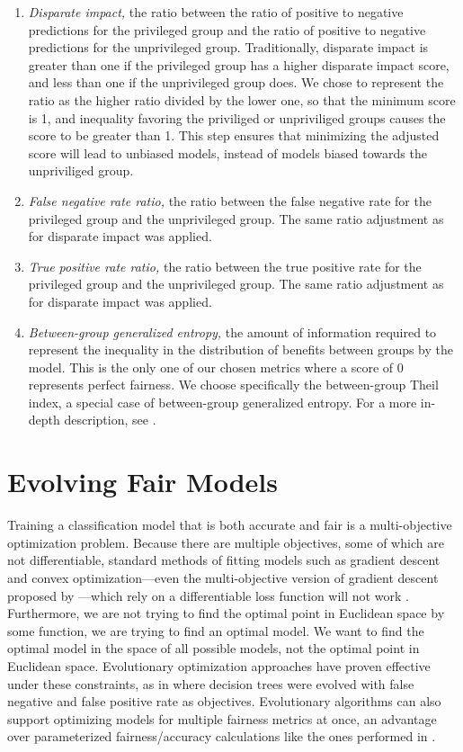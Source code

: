\documentclass[10pt]{acmart}
\begin{document}
\begin{enumerate}
	\item \textit{Disparate impact,} the ratio between the ratio of positive to negative predictions for the privileged group and the ratio of positive to negative predictions for the unprivileged group. Traditionally, disparate impact is greater than one if the privileged group has a higher disparate impact score, and less than one if the unprivileged group does. We chose to represent the ratio as the higher ratio divided by the lower one, so that the minimum score is 1, and inequality favoring the priviliged or unpriviliged groups causes the score to be greater than 1. This step ensures that minimizing the adjusted score will lead to unbiased models, instead of models biased towards the unpriviliged group.
	\item \textit{False negative rate ratio,} the ratio between the false negative rate for the privileged group and the unprivileged group. The same ratio adjustment as for disparate impact was applied.
	\item \textit{True positive rate ratio,} the ratio between the true positive rate for the privileged group and the unprivileged group. The same ratio adjustment as for disparate impact was applied.
	\item \textit{Between-group generalized entropy,} the amount of information required to represent the inequality in the distribution of benefits between groups by the model. This is the only one of our chosen metrics where a score of 0 represents perfect fairness. We choose specifically the between-group Theil index, a special case of between-group generalized entropy. For a more in-depth description, see \cite{Speicher:2018}.
\end{enumerate}

\section{Evolving Fair Models}
Training a classification model that is both accurate and fair is a multi-objective optimization problem. Because there are multiple objectives, some of which are not differentiable, standard methods of fitting models such as gradient descent and convex optimization---even the multi-objective version of gradient descent proposed by \citep{Desideri:2012}---which rely on a differentiable loss function will not work \citep{Zerbinati:2011}. Furthermore, we are not trying to find the optimal point in Euclidean space by some function, we are trying to find an optimal model. We want to find the optimal model in the space of all possible models, not the optimal point in Euclidean space. Evolutionary optimization approaches have proven effective under these constraints, as in \citep{Zhao:2007} where decision trees were evolved with false negative and false positive rate as objectives. Evolutionary algorithms can also support optimizing models for multiple fairness metrics at once, an advantage over parameterized fairness/accuracy calculations like the ones performed in \citep{Friedler:2019}.
\end{document}

